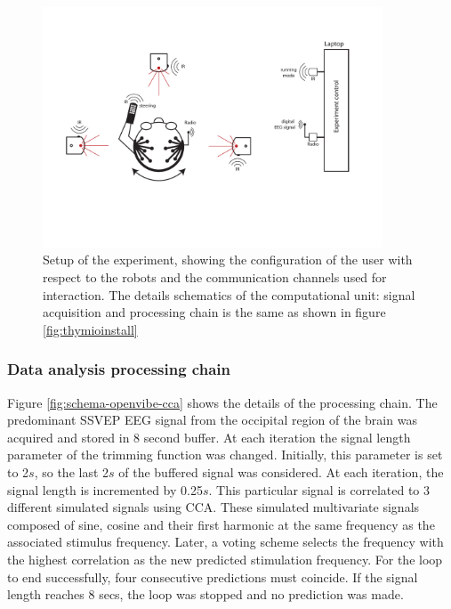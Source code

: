 \documentclass{svmult}
\begin{document}
\begin{figure}
\center
\includegraphics[width=0.9\textwidth]{figures/schema-global2.pdf}
\caption{Setup of the experiment, showing the configuration of the user with respect to the robots and the communication channels used for interaction. The details schematics of the computational unit: signal acquisition and processing chain is the same as shown in figure \ref{fig:thymioinstall}} \label{fig:experiment-set-up}
\end{figure}

\subsubsection{Data analysis processing chain}
Figure \ref{fig:schema-openvibe-cca} shows the details of the processing chain. The predominant SSVEP EEG signal from the occipital region of the brain was acquired and stored in 8 second buffer. At each iteration the signal length parameter of the trimming function was changed. Initially, this parameter is set to 2$s$, so the last 2$s$ of the buffered signal was considered. At each iteration, the signal length is incremented by 0.25$s$. This particular signal is correlated to 3 different simulated signals using CCA. These simulated multivariate signals composed of sine, cosine and their first harmonic at the same frequency as the associated stimulus frequency. Later, a voting scheme selects the frequency with the highest correlation as the new predicted stimulation frequency. For the loop to end successfully, four consecutive predictions must coincide. If the signal length reaches 8 secs, the loop was stopped and no prediction was made.
\end{document}
